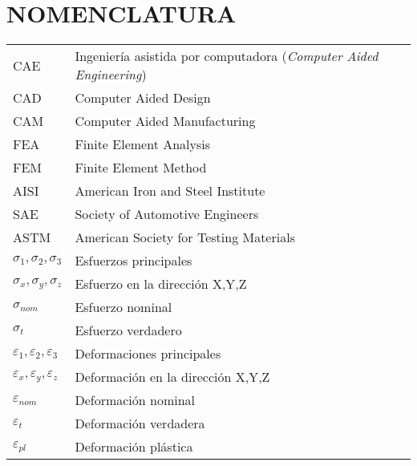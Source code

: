 \chapter*{NOMENCLATURA}




\begin{table}[h]
\def\arraystretch{1.15}
\begin{tabular}{p{4cm} p{12cm}}

CAE      &                       		      Ingeniería asistida por computadora (\textit{Computer Aided Engineering}) \\
CAD &                                  		  Computer Aided Design \\
CAM & 										  Computer Aided Manufacturing \\
FEA &                                  		  Finite Element Analysis \\
FEM & 							              Finite Element Method \\
AISI &                                        American Iron and Steel Institute \\
SAE &                                         Society of Automotive Engineers \\
ASTM &                                        American Society for Testing Materials \\
$\sigma_1, \sigma_2, \sigma_3$ &              Esfuerzos principales \\
$\sigma_x, \sigma_y, \sigma_z$ &			  Esfuerzo en la dirección X,Y,Z \\
$\sigma_{nom}$ & 							  Esfuerzo nominal \\
$\sigma_{t}$ & 								  Esfuerzo verdadero \\
$\varepsilon_1, \varepsilon_2, \varepsilon_3$ & Deformaciones principales \\
$\varepsilon_x, \varepsilon_y, \varepsilon_z$ & Deformación en la dirección X,Y,Z \\
$\varepsilon_{nom} $ &						  Deformación nominal \\
$\varepsilon_{t}$ &  						  Deformación verdadera \\
$\varepsilon_{pl}$ & 						  Deformación plástica \\

\end{tabular}
\end{table}
